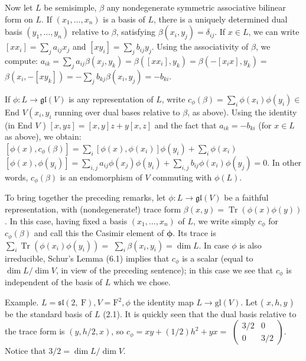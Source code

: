 \documentclass[10pt]{article}
\begin{document}
Now let $L$ be semisimple, $\beta$ any nondegenerate symmetric associative bilinear form on $L$. If $\left(x_{1}, \ldots, x_{n}\right)$ is a basis of $L$, there is a uniquely determined dual basis $\left(y_{1}, \ldots, y_{n}\right)$ relative to $\beta$, satisfying $\beta\left(x_{i}, y_{j}\right)=\delta_{i j}$. If $x \in L$, we can write $\left[x x_{i}\right]=\sum_{j} a_{i j} x_{j}$ and $\left[x y_{i}\right]=\sum_{j} b_{i j} y_{j}$. Using the associativity of $\beta$, we compute: $a_{i k}=\sum_{j} a_{i j} \beta\left(x_{j}, y_{k}\right)=\beta\left(\left[x x_{i}\right], y_{k}\right)=\beta\left(-\left[x_{i} x\right], y_{k}\right)=$ $\beta\left(x_{i},-\left[x y_{k}\right]\right)=-\sum_{j} b_{k j} \beta\left(x_{i}, y_{j}\right)=-b_{k i}$.

If $\phi: L \rightarrow \mathfrak{g l}(V)$ is any representation of $L$, write $c_{\phi}(\beta)=\sum_{i} \phi\left(x_{i}\right) \phi\left(y_{i}\right) \in$ End $V\left(x_{i}, y_{i}\right.$ running over dual bases relative to $\beta$, as above). Using the identity (in End $V$ ) $[x, y z]=[x, y] z+y[x, z]$ and the fact that $a_{i k}=-b_{k i}$ (for $x \in L$ as above), we obtain: $\left[\phi(x), c_{\phi}(\beta)\right]=\sum_{i}\left[\phi(x), \phi\left(x_{i}\right)\right] \phi\left(y_{i}\right)+\sum_{i} \phi\left(x_{i}\right)$ $\left[\phi(x), \phi\left(y_{i}\right)\right]=\sum_{i, j} a_{i j} \phi\left(x_{j}\right) \phi\left(y_{i}\right)+\sum_{i, j} b_{i j} \phi\left(x_{i}\right) \phi\left(y_{j}\right)=0$. In other words, $c_{\phi}(\beta)$ is an endomorphism of $V$ commuting with $\phi(L)$.

To bring together the preceding remarks, let $\phi: L \rightarrow \mathfrak{g l}(V)$ be a faithful representation, with (nondegenerate!) trace form $\beta(x, y)=\operatorname{Tr}(\phi(x) \phi(y))$. In this case, having fixed a basis $\left(x_{1}, \ldots, x_{n}\right)$ of $L$, we write simply $c_{\phi}$ for $c_{\phi}(\beta)$ and call this the Casimir element of $\boldsymbol{\phi}$. Its trace is $\sum_{i} \operatorname{Tr}\left(\phi\left(x_{i}\right) \phi\left(y_{i}\right)\right)=$ $\sum_{i} \beta\left(x_{i}, y_{i}\right)=\operatorname{dim} L$. In case $\phi$ is also irreducible, Schur's Lemma (6.1) implies that $c_{\phi}$ is a scalar (equal to $\operatorname{dim} L / \operatorname{dim} V$, in view of the preceding sentence); in this case we see that $c_{\phi}$ is independent of the basis of $L$ which we chose.

Example. $L=\mathfrak{s l}(2, \mathrm{~F}), V=\mathrm{F}^{2}, \phi$ the identity map $L \rightarrow \mathrm{gl}(V)$. Let ( $x, h, y$ ) be the standard basis of $L$ (2.1). It is quickly seen that the dual basis relative to the trace form is $(y, h / 2, x)$, so $c_{\phi}=x y+(1 / 2) h^{2}+y x=$ $\left(\begin{array}{cc}3 / 2 & 0 \\ 0 & 3 / 2\end{array}\right)$. Notice that $3 / 2=\operatorname{dim} L / \operatorname{dim} V$.
\end{document}
